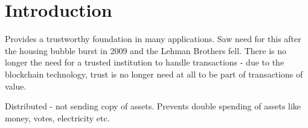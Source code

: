 \chapter{Introduction}




Provides a trustworthy foundation in many applications. Saw need for this after the housing bubble burst in 2009 and the Lehman Brothers fell. There is no longer the need for a trusted institution to handle transactions - due to the blockchain technology, trust is no longer need at all to be part of transactions of value.

Distributed - not sending copy of assets. Prevents double spending of assets like money, votes, electricity etc. 